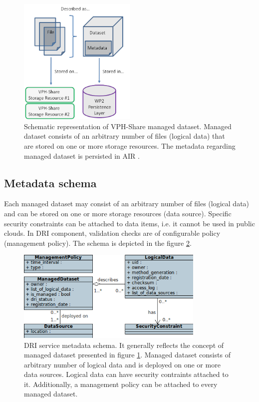 \begin{figure}[h!]
	\centering
	\includegraphics[width=0.5\textwidth]{images/managed-dataset.png}
	\caption{Schematic representation of VPH-Share managed dataset. Managed
	dataset consists of an arbitrary number of files (logical data) that are stored
	on one or more storage resources. The metadata regarding managed dataset is persisted
	in AIR \cite{vph-deliverable-2-2}.}
	\label{fig:managed-dataset}
\end{figure}

\subsection{Metadata schema}
Each managed dataset may consist of an arbitrary number of files (logical 
data) and can be stored on one or more storage resources (data source).
Specific security constraints can be attached to data items, i.e. it cannot be
used in public clouds. In DRI component, validation checks are of configurable
policy (management policy). The schema is depicted in the figure 
\ref{fig:data-model}.\\

\begin{figure}[h!]
	\centering
	\includegraphics[width=0.8\textwidth]{images/data-model.png}
	\caption{DRI service metadata schema. It generally reflects the concept of
	managed dataset presented in figure \ref{fig:managed-dataset}. Managed dataset
	consists of arbitrary number of logical data and is deployed on one or more
	data sources. Logical data can have security contraints attached to it. Additionally,
	a management policy can be attached to every managed dataset.}
	\label{fig:data-model}
\end{figure}

